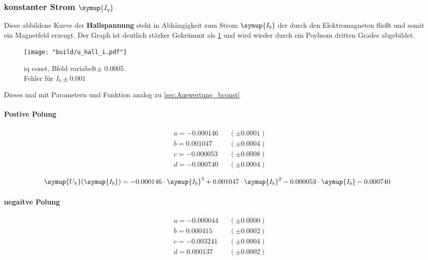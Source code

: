 \subsubsection{konstanter Strom $\symup{I_q}$}
\label{sec:Auswertung_iconst}

Diese abbildene Kurve der \textbf{Hallspannung} steht in Abhängigkeit zum Strom $\symup{I_b}$ der durch den Elektromagneten fließt und somit ein Magnetfeld erzeugt.
Der Graph ist deutlich stärker Gekrümmt als \ref{fig:Uhall} und wird wieder durch ein Poylnom dritten Grades abgebildet. 


\begin{figure}
   \centering
    \texttt{[image: "build/u\_hall\_i.pdf"]}
    \caption{iq const, Bfeld variabelt$\pm$ 0.0005\\Fehler für $I_b \pm 0.001$}
    \label{fig:Uhall}
 \end{figure}



Dieses mal mit Parametern und Funktion analog zu \ref{sec:Auswertung_bconst}
\paragraph{Postive Polung}

\begin{align*}
&a = -0.000146 &&(\pm  0.0001) \\
&b = 0.001047 &&(\pm  0.0004 ) \\
&c = -0.000053 &&(\pm  0.0008) \\
&d = -0.000740 &&(\pm  0.0004) 
\end{align*}

\begin{equation}
   \symup{U_h}(\symup{I_b})=-0.000146 \cdot \symup{I_b}^3 + 0.001047\cdot\symup{I_b}^2 -0.000053\cdot\symup{I_b} -0.000740
\end{equation}

\paragraph{negaitve Polung}

\begin{align*}
&a = -0.000044 &&(\pm 0.0000) \\
&b = 0.000415 &&(\pm 0.0002) \\
&c = -0.003241 &&(\pm 0.0004) \\
&d = 0.000137 &&(\pm 0.0002) 
\end{align*}

